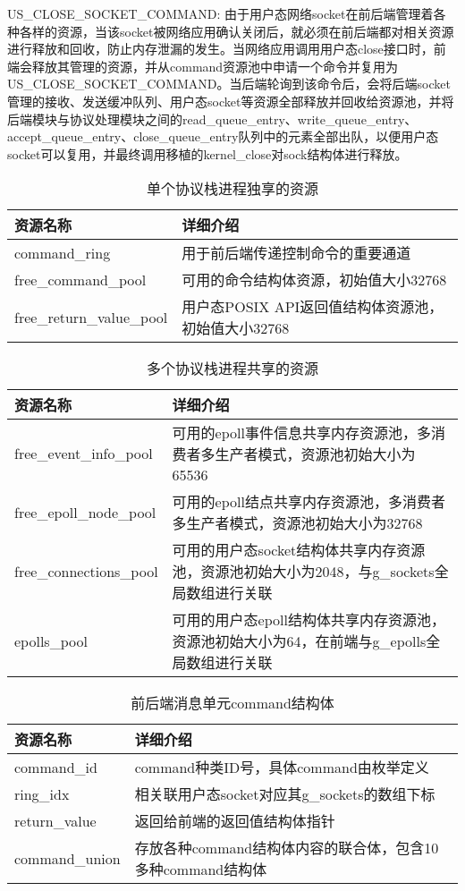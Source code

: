 US\_CLOSE\_SOCKET\_COMMAND: 由于用户态网络socket在前后端管理着各种各样的资源，当该socket被网络应用确认关闭后，就必须在前后端都对相关资源进行释放和回收，防止内存泄漏的发生。当网络应用调用用户态close接口时，前端会释放其管理的资源，并从command资源池中申请一个命令并复用为US\_CLOSE\_SOCKET\_COMMAND。当后端轮询到该命令后，会将后端socket管理的接收、发送缓冲队列、用户态socket等资源全部释放并回收给资源池，并将后端模块与协议处理模块之间的read\_queue\_entry、write\_queue\_entry、accept\_queue\_entry、close\_queue\_entry队列中的元素全部出队，以便用户态socket可以复用，并最终调用移植的kernel\_close对sock结构体进行释放。

\begin{table}[]
\centering
\caption{单个协议栈进程独享的资源}
\label{tab:onecore}
\begin{tabular}{lp{10cm}}
\toprule[1.5pt]
\textbf{资源名称} & \textbf{详细介绍} \\ 
\midrule[1pt]
command\_ring & 用于前后端传递控制命令的重要通道 \\
free\_command\_pool & 可用的命令结构体资源，初始值大小32768  \\
free\_return\_value\_pool & 用户态POSIX API返回值结构体资源池，初始值大小32768 \\
\bottomrule[1.5pt]
\end{tabular}
\end{table}

\begin{table}[]
\centering
\caption{多个协议栈进程共享的资源}
\label{tab:multicore}
\begin{tabular}{lp{10cm}}
\toprule[1.5pt]
\textbf{资源名称} & \textbf{详细介绍} \\ 
\midrule[1pt]
free\_event\_info\_pool & 可用的epoll事件信息共享内存资源池，多消费者多生产者模式，资源池初始大小为65536 \\
free\_epoll\_node\_pool & 可用的epoll结点共享内存资源池，多消费者多生产者模式，资源池初始大小为32768  \\
free\_connections\_pool & 可用的用户态socket结构体共享内存资源池，资源池初始大小为2048，与g\_sockets全局数组进行关联 \\
epolls\_pool & 可用的用户态epoll结构体共享内存资源池，资源池初始大小为64，在前端与g\_epolls全局数组进行关联 \\
\bottomrule[1.5pt]
\end{tabular}
\end{table}

\begin{table}[]
\centering
\caption{前后端消息单元command结构体}
\label{tab:command}
\begin{tabular}{lp{10cm}}
\toprule[1.5pt]
\textbf{资源名称} & \textbf{详细介绍} \\ 
\midrule[1pt]
command\_id & command种类ID号，具体command由枚举定义 \\
ring\_idx & 相关联用户态socket对应其g\_sockets的数组下标 \\
return\_value & 返回给前端的返回值结构体指针 \\
command\_union & 存放各种command结构体内容的联合体，包含10多种command结构体 \\
\bottomrule[1.5pt]
\end{tabular}
\end{table}

